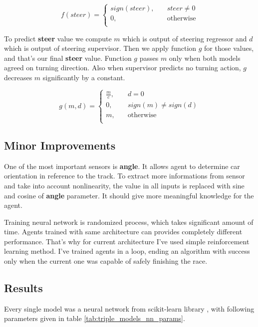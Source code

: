 \documentclass[declaration,shortabstract,english,inz]{iithesis}
\begin{document}
$$ f(steer) =  \begin{cases}
    sign(steer), &\quad steer\neq0 \\
    0, &\quad \text{otherwise} \\
  \end{cases}
 $$


To predict \textbf{steer} value we compute $m$ which is output of steering regressor and $d$ which is output of steering supervisor.
Then we apply function $g$ for those values, and that's our final \textbf{steer} value.
Function $g$ passes $m$ only when both models agreed on turning direction.
Also when supervisor predicts no turning action, $g$ decreases $m$ significantly by a constant.

 $$ g(m, d) =  \begin{cases}
    \frac{m}{c},  &\quad d = 0 \\
    0, &\quad sign(m) \neq sign(d) \\
    m, &\quad \text{otherwise} \\
  \end{cases}
 $$

\subsection{Minor Improvements}
One of the most important sensors is \textbf{angle}.
It allows agent to determine car orientation in reference to the track.
To extract more informations from sensor and take into account nonlinearity, the value in all inputs is replaced with sine and cosine of \textbf{angle} parameter.
It should give more meaningful knowledge for the agent.



Training neural network is randomized process, which takes significant amount of time.
Agents trained with same architecture can provides completely different performance.
That's why for current architecture I've used simple reinforcement learning method.
I've trained agents in a loop, ending an algorithm with success only when the current one was capable of safely finishing the race.



\subsection{Results}



Every single model was a neural network from scikit-learn library \cite{scikit_learn}, with following parameters given in table \ref{tab:triple_models_nn_params}.
\end{document}
